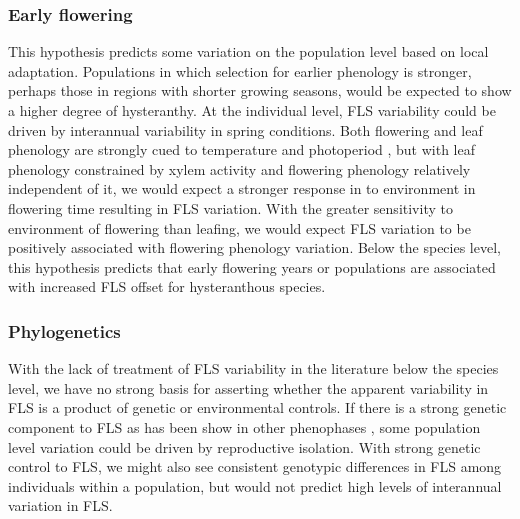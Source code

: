 \documentclass[12pt]{article}\usepackage[]{graphicx}\usepackage[]{color}
\begin{document}
\subsubsection*{Early flowering} 
\indent\indent This hypothesis predicts some variation on the population level based on local adaptation. Populations in which selection for earlier phenology is stronger, perhaps those in regions with shorter growing seasons, would be expected to show a higher degree of hysteranthy.  At the individual level, FLS variability could be driven by interannual variability in spring conditions. Both flowering and leaf phenology are strongly cued to temperature and photoperiod \citep{Flynn2018,Rathcke_1985}, but with leaf phenology constrained by xylem activity and flowering phenology relatively independent of it, we would expect a stronger response in to environment in flowering time resulting in FLS variation. With the greater sensitivity to environment of flowering than leafing, we would expect FLS variation to be positively associated with flowering phenology variation. Below the species level, this hypothesis predicts that early flowering years or populations are associated with increased FLS offset for hysteranthous species.
\subsubsection*{Phylogenetics} 
\indent\indent With the lack of treatment of FLS variability in the literature below the species level, we have no strong basis for asserting whether the apparent variability in FLS is a product of genetic or environmental controls. If there is a strong genetic component to FLS as has been show in other phenophases \citep{Wilczek2010}, some population level variation could be driven by reproductive isolation. With strong genetic control to FLS, we might also see consistent genotypic differences in FLS among individuals within a population, but would not predict high levels of interannual variation in FLS.\\

\end{document}
